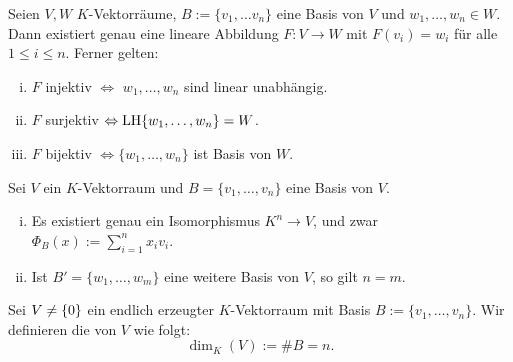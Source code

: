 \setcounter{definition}{14}
\begin{satz}
	\label{satz:I.8.15}
	Seien $V,W$ $K$-Vektorräume, $B := \{v_1,\dots v_n\}$ eine Basis von $V$ und $w_1,\dots,w_n \in W$.
	Dann existiert genau eine lineare Abbildung $F \colon V \rightarrow W$ mit $F(v_i) = w_i$ für alle $1 \leq i \leq n$.
	Ferner gelten:
	\begin{enumerate}[(i)]
		\item $F$ injektiv $\Leftrightarrow$ $w_1,\dots, w_n$ sind linear unabhängig.
		\item $F$ surjektiv $\Leftrightarrow \operatorname{LH}\{w_1,\dots,w_n\} = W$.
		\item $F$ bijektiv $\Leftrightarrow \{w_1,\dots,w_n\}$ ist Basis von $W$.
	\end{enumerate}
\end{satz}

\begin{korollar}
	\label{kor:I.8.16}
	Sei $V$ ein $K$-Vektorraum und $B = \{v_1,\dots,v_n\}$ eine Basis von $V$.
	\begin{enumerate}[(i)]
		\item	Es existiert genau ein Isomorphismus $K^n \rightarrow V$, und zwar $\Phi_B(x) := \sum_{i=1}^{n} x_iv_i$.
		\item Ist $B' = \{w_1,\dots,w_m\}$ eine weitere Basis von $V$, so gilt $n = m$.
	\end{enumerate}
\end{korollar}

\begin{definition}[Dimension]
	\label{def:I.8.17}
	Sei $V \neq \{0\}$ ein endlich erzeugter $K$-Vektorraum mit Basis $B := \{v_1,\dots,v_n\}$. 
	Wir definieren die  von $V$ wie folgt:
	\[
		\dim_K(V) := \#B = n.
	\]
\end{definition}
\newpage